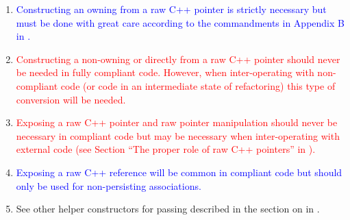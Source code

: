 {\begin{minipage}{\textwidth}
\begin{enumerate}
%
{}\item\label{conv:rcp-owning}\textcolor{blue}{Constructing an
owning {} from a raw C++ pointer is strictly necessary but
must be done with great care according to the commandments in Appendix
B in {}\cite{TeuchosMemoryManagementGuide}.}
%
{}\item\label{conv:rcp-nonowning}\textcolor{red}{Constructing a
non-owning {} or {} directly from a raw C++ pointer
should never be needed in fully compliant code.  However, when
inter-operating with non-compliant code (or code in an intermediate
state of refactoring) this type of conversion will be needed.}
%
{}\item\label{conv:obj-expose-raw-ptr}\textcolor{red}{Exposing a raw
C++ pointer and raw pointer manipulation should never be necessary in
compliant code but may be necessary when inter-operating with external
code (see Section ``The proper role of raw C++ pointers'' in
{}\cite{TeuchosMemoryManagementGuide}).}
%
{}\item\label{conv:obj-expose-raw-ref}\textcolor{blue}{Exposing a
raw C++ reference will be common in compliant code but should only be
used for non-persisting associations.}
%
{}\item\label{conv:ptr-helpers} See other helper constructors for
passing {} described in the section on {} in
{}\cite{TeuchosMemoryManagementGuide}.
%
\end{enumerate}

\end{minipage}}
